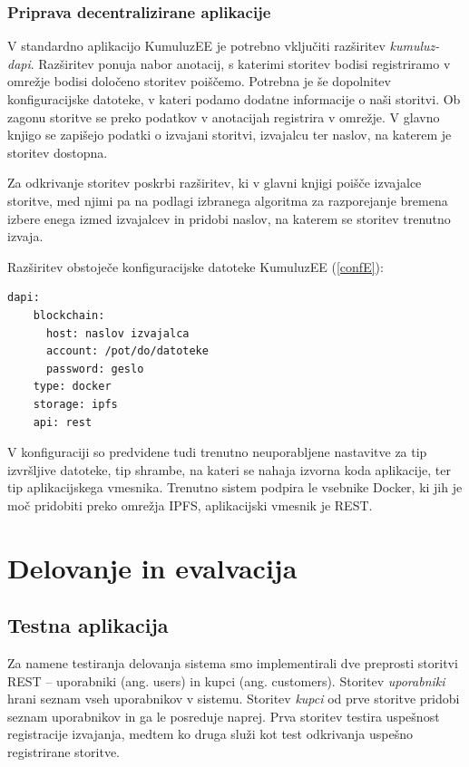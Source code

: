 \documentclass[a4paper, 12pt]{book}
\begin{document}
\subsection{Priprava decentralizirane aplikacije}
V standardno aplikacijo KumuluzEE je potrebno vključiti razširitev \textit{kumuluz-dapi}. 
Razširitev ponuja nabor anotacij, s katerimi storitev bodisi registriramo v omrežje bodisi določeno storitev poiščemo.
Potrebna je še dopolnitev konfiguracijske datoteke, v kateri podamo dodatne informacije o naši storitvi.
Ob zagonu storitve se preko podatkov v anotacijah registrira v omrežje.
V glavno knjigo se zapišejo podatki o izvajani storitvi, izvajalcu ter naslov, na katerem je storitev dostopna.

Za odkrivanje storitev poskrbi razširitev, ki v glavni knjigi poišče izvajalce storitve, med njimi pa na podlagi izbranega algoritma za razporejanje bremena izbere enega izmed izvajalcev in pridobi naslov, na katerem se storitev trenutno izvaja.

Razširitev obstoječe konfiguracijske datoteke KumuluzEE (\ref{confE}):
\begin{lstlisting}[caption={Razširitev konfiguracijske datoteke},captionpos=b,label={confE}]
  dapi:
    blockchain:
      host: naslov izvajalca
      account: /pot/do/datoteke
      password: geslo
    type: docker
    storage: ipfs
    api: rest
\end{lstlisting}

V konfiguraciji so predvidene tudi trenutno neuporabljene nastavitve za tip izvršljive datoteke, tip shrambe, na kateri se nahaja izvorna koda aplikacije, ter tip aplikacijskega vmesnika.
Trenutno sistem podpira le vsebnike Docker, ki jih je moč pridobiti preko omrežja IPFS, aplikacijski vmesnik je REST.


\chapter{Delovanje in evalvacija}

\section{Testna aplikacija}

Za namene testiranja delovanja sistema smo implementirali dve preprosti storitvi REST -- uporabniki (ang. users) in kupci (ang. customers).
Storitev \textit{uporabniki} hrani seznam vseh uporabnikov v sistemu.
Storitev \textit{kupci} od prve storitve pridobi seznam uporabnikov in ga le posreduje naprej.
Prva storitev testira uspešnost registracije izvajanja, medtem ko druga služi kot test odkrivanja uspešno registrirane storitve.
\end{document}
